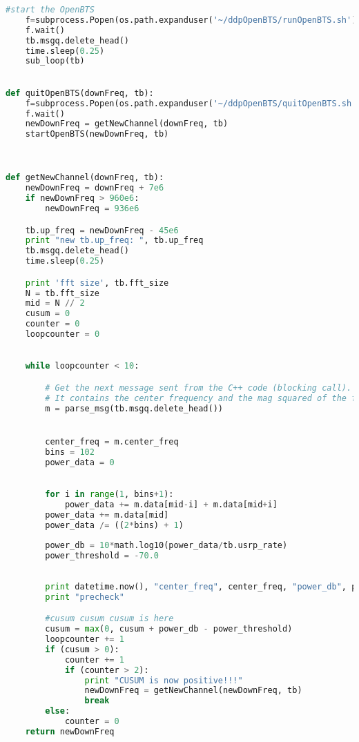 \begin{lstlisting}[language=Python]
    #start the OpenBTS
    f=subprocess.Popen(os.path.expanduser('~/ddpOpenBTS/runOpenBTS.sh'))
    f.wait()
    tb.msgq.delete_head()
    time.sleep(0.25)
    sub_loop(tb)
              

def quitOpenBTS(downFreq, tb):
    f=subprocess.Popen(os.path.expanduser('~/ddpOpenBTS/quitOpenBTS.sh'))
    f.wait()    
    newDownFreq = getNewChannel(downFreq, tb)
    startOpenBTS(newDownFreq, tb)

        

def getNewChannel(downFreq, tb):
    newDownFreq = downFreq + 7e6
    if newDownFreq > 960e6:
        newDownFreq = 936e6

    tb.up_freq = newDownFreq - 45e6
    print "new tb.up_freq: ", tb.up_freq
    tb.msgq.delete_head()
    time.sleep(0.25)

    print 'fft size', tb.fft_size
    N = tb.fft_size
    mid = N // 2
    cusum = 0
    counter = 0
    loopcounter = 0
    

    while loopcounter < 10:

        # Get the next message sent from the C++ code (blocking call).
        # It contains the center frequency and the mag squared of the fft
        m = parse_msg(tb.msgq.delete_head())


        center_freq = m.center_freq
        bins = 102
        power_data = 0

        
        for i in range(1, bins+1):
            power_data += m.data[mid-i] + m.data[mid+i]
        power_data += m.data[mid]
        power_data /= ((2*bins) + 1)
        
        power_db = 10*math.log10(power_data/tb.usrp_rate)
        power_threshold = -70.0
        
        
        print datetime.now(), "center_freq", center_freq, "power_db", power_db
        print "precheck"

        #cusum cusum cusum is here
        cusum = max(0, cusum + power_db - power_threshold)
        loopcounter += 1
        if (cusum > 0):
            counter += 1
            if (counter > 2):
                print "CUSUM is now positive!!!"
                newDownFreq = getNewChannel(newDownFreq, tb)
                break
        else:
            counter = 0
    return newDownFreq

\end{lstlisting}




